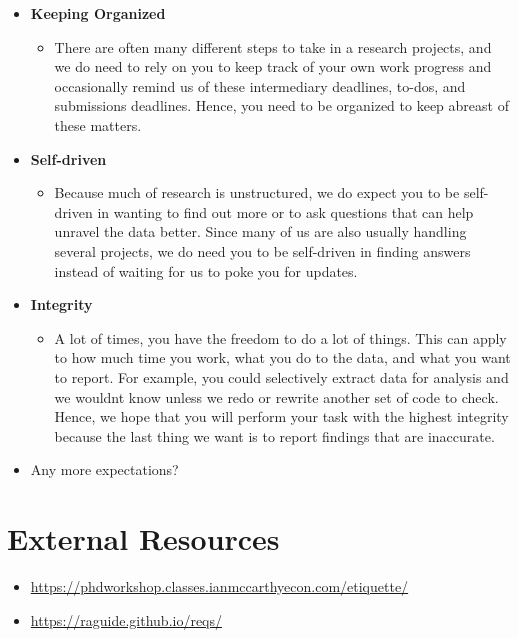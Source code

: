 \documentclass[
]{book}
\providecommand{\tightlist}{%
  \setlength{\itemsep}{0pt}\setlength{\parskip}{0pt}}
\begin{document}
\begin{itemize}
\item
  \textbf{Keeping Organized}

  \begin{itemize}
  \tightlist
  \item
    There are often many different steps to take in a research projects, and we do need to rely on you to keep track of your own work progress and occasionally remind us of these intermediary deadlines, to-dos, and submissions deadlines. Hence, you need to be organized to keep abreast of these matters.
  \end{itemize}
\item
  \textbf{Self-driven}

  \begin{itemize}
  \tightlist
  \item
    Because much of research is unstructured, we do expect you to be self-driven in wanting to find out more or to ask questions that can help unravel the data better. Since many of us are also usually handling several projects, we do need you to be self-driven in finding answers instead of waiting for us to poke you for updates.
  \end{itemize}
\item
  \textbf{Integrity}

  \begin{itemize}
  \tightlist
  \item
    A lot of times, you have the freedom to do a lot of things. This can apply to how much time you work, what you do to the data, and what you want to report. For example, you could selectively extract data for analysis and we wouldnt know unless we redo or rewrite another set of code to check. Hence, we hope that you will perform your task with the highest integrity because the last thing we want is to report findings that are inaccurate.
  \end{itemize}
\item
  Any more expectations?
\end{itemize}

\hypertarget{external-resources-2}{%
\section{External Resources}\label{external-resources-2}}

\begin{itemize}
\tightlist
\item
  \url{https://phdworkshop.classes.ianmccarthyecon.com/etiquette/}
\item
  \url{https://raguide.github.io/reqs/}
\end{itemize}
\end{document}
